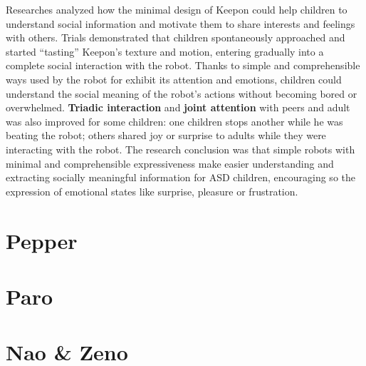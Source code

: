 Researches analyzed how the minimal design of Keepon could help children to understand social information and motivate them to share interests and feelings with others. Trials demonstrated that children spontaneously approached and started “tasting” Keepon's texture and motion, entering gradually into a complete social interaction with the robot. Thanks to simple and comprehensible ways used by the robot for exhibit its attention and emotions, children could understand the social meaning of the robot’s actions without becoming bored or overwhelmed. \textbf{Triadic interaction} and \textbf{joint attention} with peers and adult was also improved for some children: one children stops another while he was beating the robot; others shared joy or surprise to adults while they were interacting with the robot.
The research conclusion was that simple robots with  minimal and comprehensible expressiveness make easier understanding and extracting socially meaningful information for ASD children, encouraging so the expression of emotional states like surprise, pleasure or frustration.
\section{Pepper}
\section{Paro}
\section{Nao \& Zeno}
